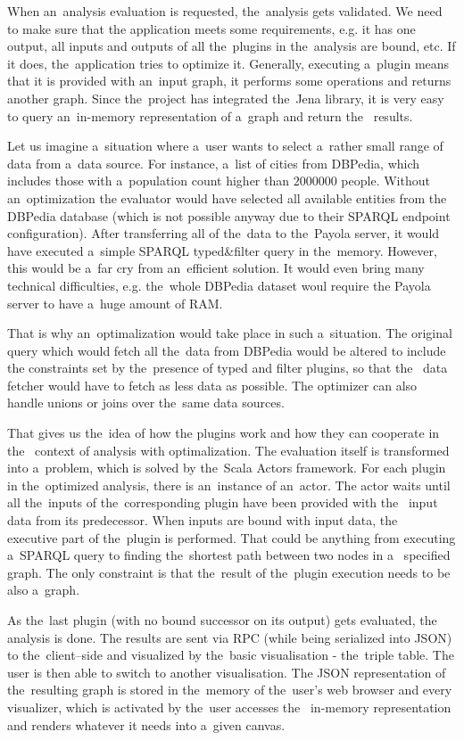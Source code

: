 When an~analysis evaluation is requested, the~analysis gets validated. We need to make
sure that the application meets some requirements, e.g. it has one 
output, all inputs and outputs of all the~plugins in the~analysis are bound, etc.
If it does, the~application tries to optimize it. Generally, executing a~plugin 
means that it is provided with an~input graph, it performs some operations and 
returns another graph. Since the~project has integrated the~Jena library, it is 
very easy to query an~in-memory representation of a~graph and return the~
results.

Let us imagine a~situation where a~user wants to select a~rather small range of 
data from a~data source. For instance, a~list of cities from DBPedia, which includes those
with a~population count higher than $2000000$ people. Without an~optimization
the evaluator would have selected all available entities from the DBPedia 
database (which is not possible anyway due to their SPARQL endpoint 
configuration). After transferring all of the~data to the~Payola server, it would have
executed a~simple SPARQL typed\&filter query in the~memory.
However, this would be a~far cry from an~efficient solution. It would even
bring many technical difficulties, e.g. the~whole DBPedia dataset woul require 
the Payola server to have a~huge amount of RAM.

That is why an~optimalization would take place in such a~situation. The original 
query which would fetch all the~data from DBPedia would be altered to include 
the constraints set by the~presence of typed and filter plugins, so that the~
data fetcher would have to fetch as less data as possible. The optimizer can 
also handle unions or joins over the~same data sources.

That gives us the~idea of how the plugins work and how they can cooperate in the~
context of analysis with optimalization. The evaluation itself is transformed 
into a~problem, which is solved by the~Scala Actors framework. For each plugin 
in the~optimized analysis, there is an~instance of an~actor. The actor waits 
until all the~inputs of the~corresponding plugin have been provided with the~
input data from its predecessor. When inputs are bound with input data, the~
executive part of the~plugin is performed. That could be anything from 
executing a~SPARQL query to finding the~shortest path between two nodes in a~
specified graph. The only constraint is that the~result of the~plugin execution 
needs to be also a~graph.

As the~last plugin (with no bound successor on its output) gets evaluated, the~
analysis is done. The results are sent via RPC (while being serialized into JSON) 
to the~client--side and visualized by the~basic visualisation - the~triple 
table. The user is then able to switch to another visualisation. The JSON 
representation of the~resulting graph is stored in the~memory of the~user's web 
browser and every visualizer, which is activated by the~user accesses the~
in-memory representation and renders whatever it needs into a~given canvas.

